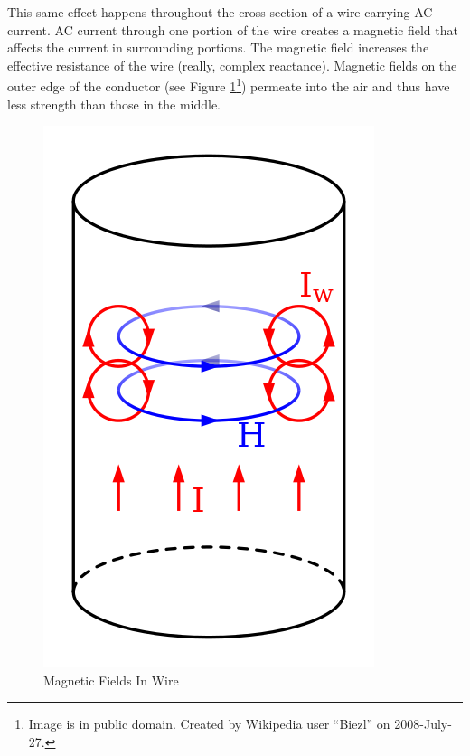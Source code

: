 This same effect happens throughout the cross-section of a wire carrying AC current. AC current through one portion of the wire creates a magnetic field that affects the current in surrounding portions. The magnetic field increases the effective resistance of the wire (really, complex reactance). Magnetic fields on the outer edge of the conductor (see Figure \ref{skin_fields}\footnote{Image is in public domain. Created by Wikipedia user ``Biezl'' on 2008-July-27.}) permeate into the air and thus have less strength than those in the middle.

\begin{figure}[h]
\centering
\includegraphics[scale=0.5]{skin_effect_fields.png}
\caption{Magnetic Fields In Wire}\label{skin_fields}
\end{figure}